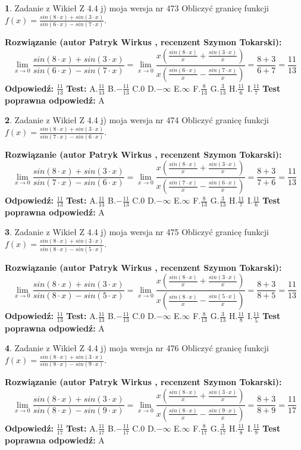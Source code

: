 \documentclass[12pt, a4paper]{article}
\theoremstyle{definition} %
\newtheorem{zad}{}
\newcommand{\zadStart}[1]{\begin{zad}#1\newline}
\newcommand{\zadStop}{\end{zad}}
\newcommand{\rozwStart}[2]{\noindent \textbf{Rozwiązanie (autor #1 , recenzent #2): }\newline}
\newcommand{\rozwStop}{\newline}
\newcommand{\odpStart}{\noindent \textbf{Odpowiedź:}\newline}
\newcommand{\odpStop}{\newline}
\newcommand{\testStart}{\noindent \textbf{Test:}\newline}
\newcommand{\testStop}{\newline}
\newcommand{\kluczStart}{\noindent \textbf{Test poprawna odpowiedź:}\newline}
\newcommand{\kluczStop}{\newline}
\begin{document}
\zadStart{Zadanie z Wikieł Z 4.4 j) moja wersja nr 473}
Obliczyć granicę funkcji $f(x)=\frac{sin(8\cdot x) +sin(3\cdot x)}{sin(6\cdot x) -sin(7\cdot x)}$.
\zadStop
\rozwStart{Patryk Wirkus}{Szymon Tokarski}
$$\lim\limits_{x\to 0}\frac{sin(8\cdot x) +sin(3\cdot x)}{sin(6\cdot x) -sin(7\cdot x)}=\lim\limits_{x\to 0}\frac{x(\frac{sin(8\cdot x)}{x}+\frac{sin(3\cdot x)}{x})}{x(\frac{sin(6\cdot x)}{x}-\frac{sin(7\cdot x)}{x})}=\frac{8+3}{6+7} = \frac{11}{13}$$
\rozwStop
\odpStart
$\frac{11}{13}$
\odpStop
\testStart
A.$\frac{11}{13}$
B.$-\frac{11}{13}$
C.$0$
D.$-\infty$
E.$\infty$
F.$\frac{8}{13}$
G.$\frac{3}{13}$
H.$\frac{11}{6}$
I.$\frac{11}{7}$
\testStop
\kluczStart
A
\kluczStop



\zadStart{Zadanie z Wikieł Z 4.4 j) moja wersja nr 474}
Obliczyć granicę funkcji $f(x)=\frac{sin(8\cdot x) +sin(3\cdot x)}{sin(7\cdot x) -sin(6\cdot x)}$.
\zadStop
\rozwStart{Patryk Wirkus}{Szymon Tokarski}
$$\lim\limits_{x\to 0}\frac{sin(8\cdot x) +sin(3\cdot x)}{sin(7\cdot x) -sin(6\cdot x)}=\lim\limits_{x\to 0}\frac{x(\frac{sin(8\cdot x)}{x}+\frac{sin(3\cdot x)}{x})}{x(\frac{sin(7\cdot x)}{x}-\frac{sin(6\cdot x)}{x})}=\frac{8+3}{7+6} = \frac{11}{13}$$
\rozwStop
\odpStart
$\frac{11}{13}$
\odpStop
\testStart
A.$\frac{11}{13}$
B.$-\frac{11}{13}$
C.$0$
D.$-\infty$
E.$\infty$
F.$\frac{8}{13}$
G.$\frac{3}{13}$
H.$\frac{11}{7}$
I.$\frac{11}{6}$
\testStop
\kluczStart
A
\kluczStop



\zadStart{Zadanie z Wikieł Z 4.4 j) moja wersja nr 475}
Obliczyć granicę funkcji $f(x)=\frac{sin(8\cdot x) +sin(3\cdot x)}{sin(8\cdot x) -sin(5\cdot x)}$.
\zadStop
\rozwStart{Patryk Wirkus}{Szymon Tokarski}
$$\lim\limits_{x\to 0}\frac{sin(8\cdot x) +sin(3\cdot x)}{sin(8\cdot x) -sin(5\cdot x)}=\lim\limits_{x\to 0}\frac{x(\frac{sin(8\cdot x)}{x}+\frac{sin(3\cdot x)}{x})}{x(\frac{sin(8\cdot x)}{x}-\frac{sin(5\cdot x)}{x})}=\frac{8+3}{8+5} = \frac{11}{13}$$
\rozwStop
\odpStart
$\frac{11}{13}$
\odpStop
\testStart
A.$\frac{11}{13}$
B.$-\frac{11}{13}$
C.$0$
D.$-\infty$
E.$\infty$
F.$\frac{8}{13}$
G.$\frac{3}{13}$
H.$\frac{11}{8}$
I.$\frac{11}{5}$
\testStop
\kluczStart
A
\kluczStop



\zadStart{Zadanie z Wikieł Z 4.4 j) moja wersja nr 476}
Obliczyć granicę funkcji $f(x)=\frac{sin(8\cdot x) +sin(3\cdot x)}{sin(8\cdot x) -sin(9\cdot x)}$.
\zadStop
\rozwStart{Patryk Wirkus}{Szymon Tokarski}
$$\lim\limits_{x\to 0}\frac{sin(8\cdot x) +sin(3\cdot x)}{sin(8\cdot x) -sin(9\cdot x)}=\lim\limits_{x\to 0}\frac{x(\frac{sin(8\cdot x)}{x}+\frac{sin(3\cdot x)}{x})}{x(\frac{sin(8\cdot x)}{x}-\frac{sin(9\cdot x)}{x})}=\frac{8+3}{8+9} = \frac{11}{17}$$
\rozwStop
\odpStart
$\frac{11}{17}$
\odpStop
\testStart
A.$\frac{11}{17}$
B.$-\frac{11}{17}$
C.$0$
D.$-\infty$
E.$\infty$
F.$\frac{8}{17}$
G.$\frac{3}{17}$
H.$\frac{11}{8}$
I.$\frac{11}{9}$
\testStop
\kluczStart
A
\kluczStop
\end{document}
